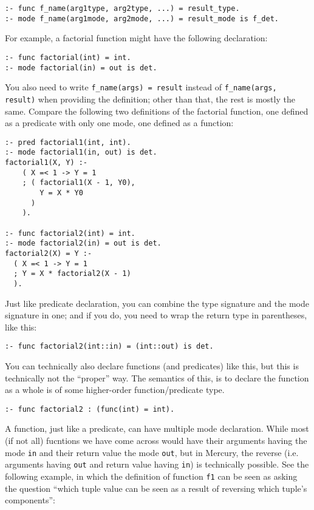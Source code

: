 \begin{lstlisting}[language=Mercury]
:- func f_name(arg1type, arg2type, ...) = result_type.
:- mode f_name(arg1mode, arg2mode, ...) = result_mode is f_det.
\end{lstlisting}

  For example, a factorial function might have the following declaration:

\begin{lstlisting}[language=Mercury]
:- func factorial(int) = int.
:- mode factorial(in) = out is det.
\end{lstlisting}

  You also need to write \texttt{f\_name(args) = result} instead of \texttt{f\_name(args, result)} when providing the definition; other than that, the rest is mostly the same. Compare the following two definitions of the factorial function, one defined as a predicate with only one mode, one defined as a function:

\begin{lstlisting}[language=Mercury]
:- pred factorial1(int, int).
:- mode factorial1(in, out) is det.
factorial1(X, Y) :-
	( X =< 1 -> Y = 1
	; ( factorial1(X - 1, Y0),
		Y = X * Y0
	  )
	).

:- func factorial2(int) = int.
:- mode factorial2(in) = out is det.
factorial2(X) = Y :-
  ( X =< 1 -> Y = 1
  ; Y = X * factorial2(X - 1)
  ).
\end{lstlisting}

  Just like predicate declaration, you can combine the type signature and the mode signature in one; and if you do, you need to wrap the return type in parentheses, like this:

\begin{lstlisting}[language=Mercury]
:- func factorial2(int::in) = (int::out) is det.
\end{lstlisting}

  You can technically also declare functions (and predicates) like this, but this is technically not the ``proper'' way. The semantics of this, is to declare the function as a whole is of some higher-order function/predicate type.
  
\begin{lstlisting}[language=Mercury]
:- func factorial2 : (func(int) = int).
\end{lstlisting}

A function, just like a predicate, can have multiple mode declaration. While most (if not all) fucntions we have come across would have their arguments having the mode \texttt{in} and their return value the mode \texttt{out}, but in Mercury, the reverse (i.e. arguments having \texttt{out} and return value having \texttt{in}) is technically possible. See the following example, in which the definition of function \texttt{f1} can be seen as asking the question ``which tuple value can be seen as a result of reversing which tuple's components'':

